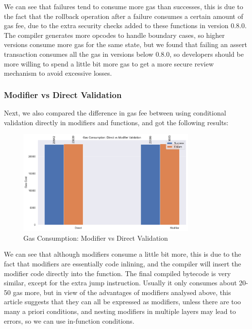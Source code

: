 We can see that failures tend to consume more gas than successes, this is due to the fact that the rollback operation after a failure consumes a certain amount of gas fee, due to the extra security checks added to these functions in version 0.8.0. The compiler generates more opcodes to handle boundary cases, so higher versions consume more gas for the same state, but we found that failing an assert transaction consumes all the gas in versions below 0.8.0, so developers should be more willing to spend a little bit more gas to get a more secure review mechanism to avoid excessive losses.

\subsubsection{Modifier vs Direct Validation}
Next, we also compared the difference in gas fee between using conditional validation directly in modifiers and functions, and got the following results:

\begin{figure}[h]
    \centering
    \includegraphics[width=0.8\textwidth]{figures/modifier_comparison.pdf}
    \caption{Gas Consumption: Modifier vs Direct Validation}
    \label{fig:modifier_comparison}
\end{figure}

We can see that although modifiers consume a little bit more, this is due to the fact that modifiers are essentially code inlining, and the compiler will insert the modifier code directly into the function. The final compiled bytecode is very similar, except for the extra jump instruction. Usually it only consumes about 20-50 gas more, but in view of the advantages of modifiers analysed above, this article suggests that they can all be expressed as modifiers, unless there are too many a priori conditions, and nesting modifiers in multiple layers may lead to errors, so we can use in-function conditions.

